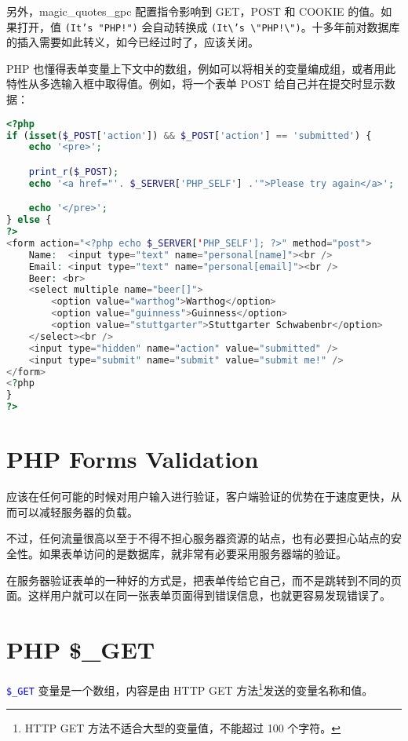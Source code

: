 另外，magic\_quotes\_gpc 配置指令影响到 GET，POST 和 COOKIE 的值。如果打开，值 \texttt{(It's "PHP!")} 会自动转换成 \texttt{(It\textbackslash 's \textbackslash "PHP!\textbackslash ")}。十多年前对数据库的插入需要如此转义，如今已经过时了，应该关闭。


PHP 也懂得表单变量上下文中的数组，例如可以将相关的变量编成组，或者用此特性从多选输入框中取得值。例如，将一个表单 POST 给自己并在提交时显示数据：

\begin{lstlisting}[language=PHP]
<?php
if (isset($_POST['action']) && $_POST['action'] == 'submitted') {
    echo '<pre>';

    print_r($_POST);
    echo '<a href="'. $_SERVER['PHP_SELF'] .'">Please try again</a>';

    echo '</pre>';
} else {
?>
<form action="<?php echo $_SERVER['PHP_SELF']; ?>" method="post">
    Name:  <input type="text" name="personal[name]"><br />
    Email: <input type="text" name="personal[email]"><br />
    Beer: <br>
    <select multiple name="beer[]">
        <option value="warthog">Warthog</option>
        <option value="guinness">Guinness</option>
        <option value="stuttgarter">Stuttgarter Schwabenbr</option>
    </select><br />
    <input type="hidden" name="action" value="submitted" />
    <input type="submit" name="submit" value="submit me!" />
</form>
<?php
}
?>
\end{lstlisting}





\chapter{PHP Forms Validation}

应该在任何可能的时候对用户输入进行验证，客户端验证的优势在于速度更快，从而可以减轻服务器的负载。


不过，任何流量很高以至于不得不担心服务器资源的站点，也有必要担心站点的安全性。如果表单访问的是数据库，就非常有必要采用服务器端的验证。

在服务器验证表单的一种好的方式是，把表单传给它自己，而不是跳转到不同的页面。这样用户就可以在同一张表单页面得到错误信息，也就更容易发现错误了。



\chapter{PHP \$\_GET}

\textcolor{Blue}{\texttt{\$\_GET}} 变量是一个数组，内容是由 HTTP GET 方法\footnote{HTTP GET 方法不适合大型的变量值，不能超过 100 个字符。}发送的变量名称和值。


